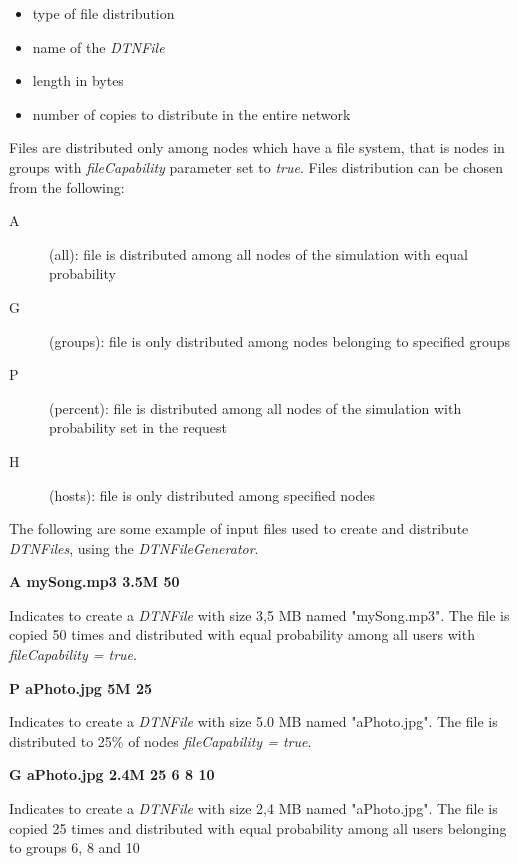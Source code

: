 \begin{itemize}
\item type of file distribution 
\item name of the \textit{DTNFile}
\item length in bytes
\item number of copies to distribute in the entire network
\end{itemize}

Files are distributed only among nodes which have a file system, that is nodes in groups with \textit{fileCapability} parameter set to \textit{true}. Files distribution can be chosen from the following:

\begin{description}
\item[A] (all): file is distributed among all nodes of the simulation with equal probability
\item[G] (groups): file is only distributed among nodes belonging to specified groups
\item[P] (percent): file is distributed among all nodes of the simulation with probability set in the request
\item[H] (hosts): file is only distributed among specified nodes  
\end{description}

The following are some example of input files used to create and distribute \textit{DTNFiles}, using the \textit{DTNFileGenerator}.

\begin{center}
\textbf{A	mySong.mp3	3.5M	50}
\end{center}
Indicates to create a \textit{DTNFile} with size 3,5 MB named "mySong.mp3". The file is copied 50 times and distributed with equal probability among all users with \textit{fileCapability = true}.
\\

\begin{center}
\textbf{P	aPhoto.jpg	5M	25}
\end{center}
Indicates to create a \textit{DTNFile} with size 5.0 MB named "aPhoto.jpg". The file is distributed to 25\% of nodes \textit{fileCapability = true}.
\\

\begin{center}
\textbf{G	aPhoto.jpg	2.4M	25	6	8	10}
\end{center}
Indicates to create a \textit{DTNFile} with size 2,4 MB named "aPhoto.jpg". The file is copied 25 times and distributed with equal probability among all users belonging to groups 6, 8 and 10
\\

